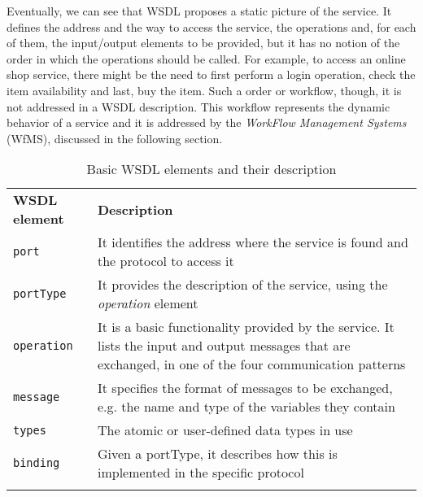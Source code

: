 Eventually, we can see that WSDL proposes a static picture of the service. It defines the address and the way to access the service, the operations and, for each of them, the input/output elements to be provided, but it has no notion of the order in which the operations should be called. For example, to access an online shop service, there might be the need to first perform a login operation, check the item availability and last, buy the item. Such a order or workflow, though, it is not addressed in a WSDL description. This workflow represents the dynamic behavior of a service and it is addressed by the \textit{WorkFlow Management Systems} (WfMS), discussed in the following section.


% 
\begin{table}
\begin{center}
\begin{tabular}{l p{11cm}}

						\toprule
						\addlinespace[0.2cm]
\textbf{WSDL element} 	& \textbf{Description}	\\ 
						\cmidrule(l){1-2}
\verb|port| 		& It identifies the address where the service is found and the protocol to access it 				\\[0,1cm]
\verb|portType| 	& It provides the description of the service, using the \textit{operation} element 				\\[0,1cm]
\verb|operation| 	& It is a basic functionality provided by the service. It lists the input and output messages that are exchanged, in one of the four communication patterns 														\\[0,1cm]
\verb|message| 		& It specifies the format of messages to be exchanged, e.g. the name and type of the variables they contain 	\\[0,1cm]
\verb|types|		& The atomic or user-defined data types in use  								\\[0,1cm]
\verb|binding|		& Given a portType, it describes how this is implemented in the specific protocol 				\\[0,1cm]
	 
						\addlinespace[0.2cm]
						\bottomrule
\end{tabular}
\end{center}
\caption{Basic WSDL elements and their description}
\label{tab:WSDLElements}
\end{table}

